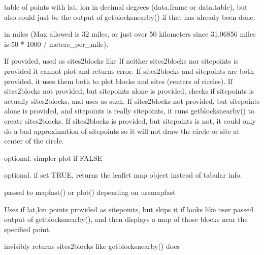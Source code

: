 \documentclass[a4paper]{book}
\begin{document}
\begin{Arguments}
\begin{ldescription}
\item[\code{sitepoints}] table of points with lat, lon in decimal degrees (data.frame or data.table),
but also could just be the output of getblocksnearby() if that has already been done.

\item[\code{radius}] in miles (Max allowed is 32 miles, or just over 50 kilometers since 31.06856 miles is 50 * 1000 / meters\_per\_mile).

\item[\code{sites2blocks}] If provided, used as sites2blocks like 
If neither sites2blocks nor sitepoints is provided it cannot plot and returns error.
If sites2blocks and sitepoints are both provided, it uses them both to plot blocks and sites (centers of circles).
If sites2blocks not provided, but sitepoints alone is provided, checks if sitepoints is actually sites2blocks, and uses as such.
If sites2blocks not provided, but sitepoints alone is provided, and sitepoints is really sitepoints, it runs getblocksnearby() to create sites2blocks.
If sites2blocks is provided, but sitepoints is not, it could only do a bad approximation of sitepoints so it will not draw the circle or site at center of the circle.

\item[\code{usemapfast}] optional. simpler plot if FALSE

\item[\code{returnmap}] optional. if set TRUE, returns the leaflet map object instead of tabular info.

\item[\code{...}] passed to mapfast() or plot() depending on usemapfast
\end{ldescription}
\end{Arguments}
%
\begin{Details}\relax
Uses  if lat,lon points provided as sitepoints,
but skips it if looks like user passed output of getblocksnearby(),
and then displays a map of those blocks near the specified point.
\end{Details}
%
\begin{Value}
invisibly returns sites2blocks like getblocksnearby() does
\end{Value}
%
\end{document}
